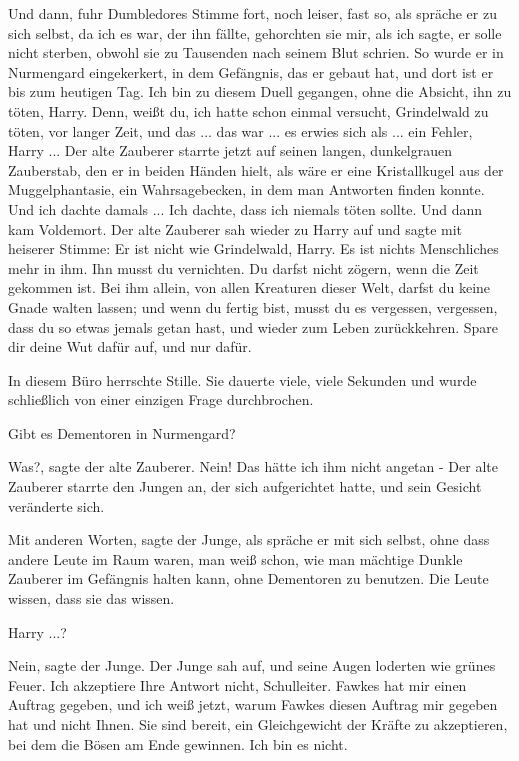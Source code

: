 \glqq{}Und dann\grqq{}, fuhr Dumbledores Stimme fort, noch leiser, fast so, als
spräche er zu sich selbst, \glqq{}da ich es war, der ihn fällte, gehorchten sie
mir, als ich sagte, er solle nicht sterben, obwohl sie zu Tausenden nach seinem
Blut schrien. So wurde er in Nurmengard eingekerkert, in dem Gefängnis, das er
gebaut hat, und dort ist er bis zum heutigen Tag. Ich bin zu diesem Duell
gegangen, ohne die Absicht, ihn zu töten, Harry. Denn, weißt du, ich hatte schon
einmal versucht, Grindelwald zu töten, vor langer Zeit, und das ... das war ... es
erwies sich als ... ein Fehler, Harry ...\grqq{} Der alte Zauberer starrte jetzt
auf seinen langen, dunkelgrauen Zauberstab, den er in beiden Händen hielt, als
wäre er eine Kristallkugel aus der Muggelphantasie, ein Wahrsagebecken, in dem
man Antworten finden konnte. \glqq{}Und ich dachte damals ... Ich dachte, dass ich
niemals töten sollte. Und dann kam Voldemort.\grqq{} Der alte Zauberer sah
wieder zu Harry auf und sagte mit heiserer Stimme: \glqq{}Er ist nicht wie
Grindelwald, Harry. Es ist nichts Menschliches mehr in ihm. Ihn musst du
vernichten. Du darfst nicht zögern, wenn die Zeit gekommen ist. Bei ihm allein,
von allen Kreaturen dieser Welt, darfst du keine Gnade walten lassen; und wenn
du fertig bist, musst du es vergessen, vergessen, dass du so etwas jemals getan
hast, und wieder zum Leben zurückkehren. Spare dir deine Wut dafür auf, und nur
dafür.\grqq{}

In diesem Büro herrschte Stille. Sie dauerte viele, viele Sekunden und wurde
schließlich von einer einzigen Frage durchbrochen.

\glqq{}Gibt es Dementoren in Nurmengard?\grqq{}

\glqq{}Was?\grqq{}, sagte der alte Zauberer. \glqq{}Nein! Das hätte ich ihm nicht
angetan -\grqq{} Der alte Zauberer starrte den Jungen an, der sich aufgerichtet
hatte, und sein Gesicht veränderte sich.

\glqq{}Mit anderen Worten\grqq{}, sagte der Junge, als spräche er mit sich
selbst, ohne dass andere Leute im Raum waren, \glqq{}man weiß schon, wie man
mächtige Dunkle Zauberer im Gefängnis halten kann, ohne Dementoren zu benutzen.
Die Leute wissen, dass sie das wissen.\grqq{}

\glqq{}Harry ...?\grqq{}

\glqq{}Nein\grqq{}, sagte der Junge. Der Junge sah auf, und seine Augen loderten
wie grünes Feuer. \glqq{}Ich akzeptiere Ihre Antwort nicht, Schulleiter. Fawkes
hat mir einen Auftrag gegeben, und ich weiß jetzt, warum Fawkes diesen Auftrag
mir gegeben hat und nicht Ihnen. Sie sind bereit, ein Gleichgewicht der Kräfte
zu akzeptieren, bei dem die Bösen am Ende gewinnen. Ich bin es nicht.\grqq{}

